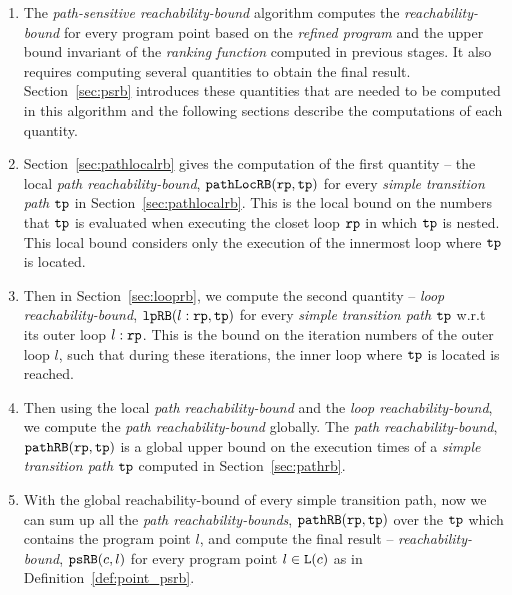 \begin{enumerate}
\item The \emph{path-sensitive reachability-bound} algorithm computes the \emph{reachability-bound} for every program point based on the \emph{refined program} and the upper bound invariant of the \emph{ranking function} computed in previous stages.
It also requires computing several quantities to obtain the final result.
Section~\ref{sec:psrb} introduces these quantities that are needed to be computed in this algorithm and the following sections describe the computations of each quantity. 
 \item Section~\ref{sec:pathlocalrb} gives the computation of the first quantity -- the local \emph{path reachability-bound}, $\mathtt{pathLocRB}(\mathtt{rp}, \mathtt{tp})$ for every \emph{simple transition path} $\mathtt{tp}$ in Section~\ref{sec:pathlocalrb}. 
 This is the local bound on the numbers that  $\mathtt{tp}$ is evaluated when executing the closet loop  $\mathtt{rp}$ in which $\mathtt{tp}$ is nested.
 This local bound considers only the execution of the innermost loop where $\mathtt{tp}$ is located.
 \item Then in Section~\ref{sec:looprb}, we compute the second quantity -- \emph{loop reachability-bound}, $\mathtt{lpRB}(l: \mathtt{rp}, \mathtt{tp})$ for every \emph{simple transition path} $\mathtt{tp}$
 w.r.t its outer loop $l: \mathtt{rp}$. 
 This is the bound on the iteration numbers of the outer loop $l$,
 such that during these iterations, the inner loop where $\mathtt{tp}$ is located is reached.
 \item Then using the local \emph{path reachability-bound} and the  \emph{loop reachability-bound},
 we compute the \emph{path reachability-bound} globally.
 The \emph{path reachability-bound}, $\mathtt{pathRB}(\mathtt{rp}, \mathtt{tp})$ is a global upper bound on the execution times of a \emph{simple transition path} $\mathtt{tp}$ computed in Section~\ref{sec:pathrb}.
 
 \item With the global reachability-bound of every simple transition path, now we can sum up all the \emph{path reachability-bounds}, $\mathtt{pathRB}(\mathtt{rp}, \mathtt{tp})$ over the $\mathtt{tp}$ which contains the program point $l$, and compute the final result -- \emph{reachability-bound}, $\mathtt{psRB}(c, l)$ for every program point $l \in \mathtt{L}(c)$ as in Definition~\ref{def:point_psrb}.
\end{enumerate}